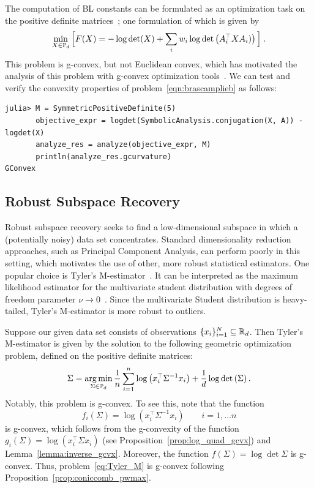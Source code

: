 \documentclass[twoside,11pt]{article}
\begin{document}
The computation of BL constants can be formulated as 
an optimization task on the positive definite matrices~\citep{BL1,BL2}; one formulation of which is given by~\citep{sra_brascamplieb} 
\begin{equation}
\label{eqn:brascamplieb}
    \min_{X \in \mathbb{P}_d} \Big[ F(X)=-\log \operatorname{det}(X)+\sum_i w_i \log \operatorname{det}\left(A_i^\top X A_i)\right) \Big] \; .
\end{equation}
This problem is g-convex, but not Euclidean convex, which has motivated the analysis of this problem with g-convex optimization tools~\citep{gurvits,garg2018algorithmic,burgisser2018efficient,thompson}.
We can test and verify the convexity properties of problem~\ref{eqn:brascamplieb} as follows:
\begin{listing}[h!]
    \begin{verbatim}
julia> M = SymmetricPositiveDefinite(5)
       objective_expr = logdet(SymbolicAnalysis.conjugation(X, A)) - logdet(X)
       analyze_res = analyze(objective_expr, M)
       println(analyze_res.gcurvature)
GConvex
    \end{verbatim}
\end{listing}


\subsection{Robust Subspace Recovery}
Robust subspace recovery seeks to find a low-dimensional subspace in which a (potentially noisy) data set concentrates. Standard dimensionality reduction approaches, such as Principal Component Analysis, can perform poorly in this setting, which motivates the use of other, more robust statistical estimators. One popular choice is Tyler's M-estimator~\citep{Tyler1987}. It can be interpreted as the maximum likelihood estimator for the multivariate student distribution with degrees of freedom parameter $\nu \to 0$~\citep{Maronna2006}. Since the multivariate Student distribution is heavy-tailed, Tyler's M-estimator is more robust to outliers.

Suppose our given data set consists of observations $\{x_i\}_{i=1}^N \subseteq \mathbb{R}_d$. Then Tyler's M-estimator is given by the solution to the following geometric optimization problem, defined on the positive definite matrices:
\begin{equation}\label{eq:Tyler_M}
    \Sigma = \operatorname*{arg\,min}_{\Sigma \in \mathbb{P}_d} \frac{1}{n}\sum_{i=1}^n \log \left(x_i^\top \Sigma^{-1}x_i\right) + \frac{1}{d}\log \det \left(\Sigma \right).
\end{equation}
Notably, this problem is g-convex. To see this, note that the function 
\[
f_i(\Sigma) = \log \left(x_i^\top \Sigma^{-1}x_i\right) \qquad i = 1, \ldots n
\]
is g-convex, which follows from the g-convexity of the function $g_i(\Sigma) = \log \left( x_i^\top \Sigma x_i\right)$ (see Proposition~\ref{prop:log_quad_gcvx}) and Lemma~\ref{lemma:inverse_gcvx}. Moreover, the function $f(\Sigma) = \log \det \Sigma$ is g-convex. Thus, problem~\ref{eq:Tyler_M} is g-convex following Proposition~\ref{prop:coniccomb_pwmax}.
\end{document}
